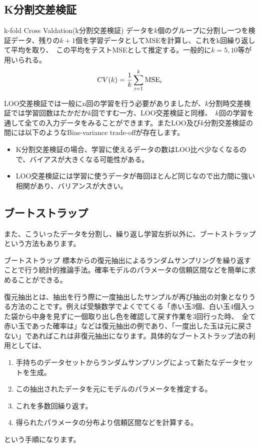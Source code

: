 \documentclass[uplatex]{jsarticle}
\begin{document}
\subsection{K分割交差検証}
\begin{itembox}[l]{k-fold Cross Valdation(k分割交差検証)}
  データを$k$個のグループに分割し一つを検証データ、残りの$k+1$個を学習データとしてMSEを計算し、これをk回繰り返して平均を取り、\
  この平均をテストMSEとして推定する。一般的に$k=5, 10$等が用いられる。
  $$CV(k) = \frac{1}{k}\sum_{i=1}^k {\rm MSE}_i$$
\end{itembox}
LOO交差検証では一般にn回の学習を行う必要がありましたが、$k$分割時交差検証では学習回数はたかだか$k$回ですむ一方、LOO交差検証と同様、\
$k$回の学習を通して全ての入力データをみることができます。またLOO及び$k$分割交差検証の間には以下のようなBias-variance trade-offが存在します。
  \begin{itemize}
    \item K分割交差検証の場合、学習に使えるデータの数はLOO比べ少なくなるので、バイアスが大きくなる可能性がある。
    \item LOO交差検証には学習に使うデータが毎回ほとんど同じなので出力間に強い相関があり、バリアンスが大きい。
  \end{itemize}

\subsection{ブートストラップ}
また、こういったデータを分割し、繰り返し学習左折以外に、ブートストラップという方法もあります。
 \begin{itembox}[l]{ブートストラップ}
   標本からの復元抽出によるランダムサンプリングを繰り返すことで行う統計的推論手法。確率モデルのパラメータの信頼区間などを簡単に求めることができる。
 \end{itembox}
 復元抽出とは、抽出を行う際に一度抽出したサンプルが再び抽出の対象となりうる方法のことです。例えば受験数学でよくでてくる「赤い玉3個、白い玉4個入った袋から中身を見ずに一個取り出し色を確認して戻す作業を3回行った時、\
 全て赤い玉であった確率は」などは復元抽出の例であり、「一度出した玉は元に戻さない」であればこれは非復元抽出になります。具体的なブートストラップ法の利用としては、
 \begin{enumerate}
   \item 手持ちのデータセットからランダムサンプリングによって新たなデータセットを生成。
   \item この抽出されたデータを元にモデルのパラメータを推定する。
   \item これを多数回繰り返す。
   \item 得られたパラメータの分布より信頼区間などを計算する。
 \end{enumerate}
という手順になります。
\end{document}
